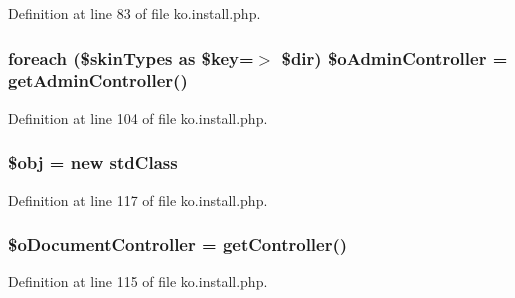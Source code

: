 Definition at line 83 of file ko.\+install.\+php.

\hypertarget{ko_8install_8php_a4e2098076e50f24dd86e1062844d25d5}{}
\subsubsection[{\$o\+Admin\+Controller}]{\setlength{\rightskip}{0pt plus 5cm}foreach (\$skin\+Types as \$key=$>$ \$dir) \$o\+Admin\+Controller = {\bf get\+Admin\+Controller}(\textquotesingle{})}\label{ko_8install_8php_a4e2098076e50f24dd86e1062844d25d5}


Definition at line 104 of file ko.\+install.\+php.

\hypertarget{ko_8install_8php_a9008ed94ba185855b1723e367744b87e}{}
\subsubsection[{\$obj}]{\setlength{\rightskip}{0pt plus 5cm}\$obj = new std\+Class}\label{ko_8install_8php_a9008ed94ba185855b1723e367744b87e}


Definition at line 117 of file ko.\+install.\+php.

\hypertarget{ko_8install_8php_aac43fce682d4b7a05df6d3e44c2c54e6}{}
\subsubsection[{\$o\+Document\+Controller}]{\setlength{\rightskip}{0pt plus 5cm}\$o\+Document\+Controller = {\bf get\+Controller}(\textquotesingle{})}\label{ko_8install_8php_aac43fce682d4b7a05df6d3e44c2c54e6}


Definition at line 115 of file ko.\+install.\+php.

\hypertarget{ko_8install_8php_afb18aa87e5520385e76377e876e042af}{}
